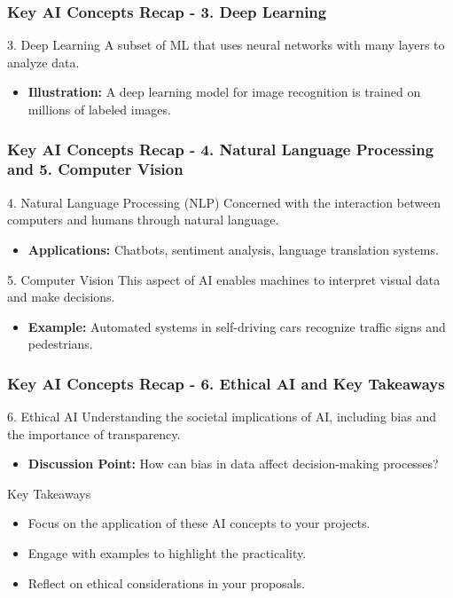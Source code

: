 \documentclass[aspectratio=169]{beamer}
\begin{document}
\begin{frame}[fragile]
    \frametitle{Key AI Concepts Recap - 3. Deep Learning}
    \begin{block}{3. Deep Learning}
        A subset of ML that uses neural networks with many layers to analyze data.
    \end{block}
    \begin{itemize}
        \item \textbf{Illustration:} A deep learning model for image recognition is trained on millions of labeled images.
    \end{itemize}
\end{frame}

\begin{frame}[fragile]
    \frametitle{Key AI Concepts Recap - 4. Natural Language Processing and 5. Computer Vision}
    \begin{block}{4. Natural Language Processing (NLP)}
        Concerned with the interaction between computers and humans through natural language.
    \end{block}
    \begin{itemize}
        \item \textbf{Applications:} Chatbots, sentiment analysis, language translation systems.
    \end{itemize}

    \begin{block}{5. Computer Vision}
        This aspect of AI enables machines to interpret visual data and make decisions.
    \end{block}
    \begin{itemize}
        \item \textbf{Example:} Automated systems in self-driving cars recognize traffic signs and pedestrians.
    \end{itemize}
\end{frame}

\begin{frame}[fragile]
    \frametitle{Key AI Concepts Recap - 6. Ethical AI and Key Takeaways}
    \begin{block}{6. Ethical AI}
        Understanding the societal implications of AI, including bias and the importance of transparency.
    \end{block}
    \begin{itemize}
        \item \textbf{Discussion Point:} How can bias in data affect decision-making processes?
    \end{itemize}
    
    \begin{block}{Key Takeaways}
        \begin{itemize}
            \item Focus on the application of these AI concepts to your projects.
            \item Engage with examples to highlight the practicality.
            \item Reflect on ethical considerations in your proposals.
        \end{itemize}
    \end{block}
\end{frame}
\end{document}
